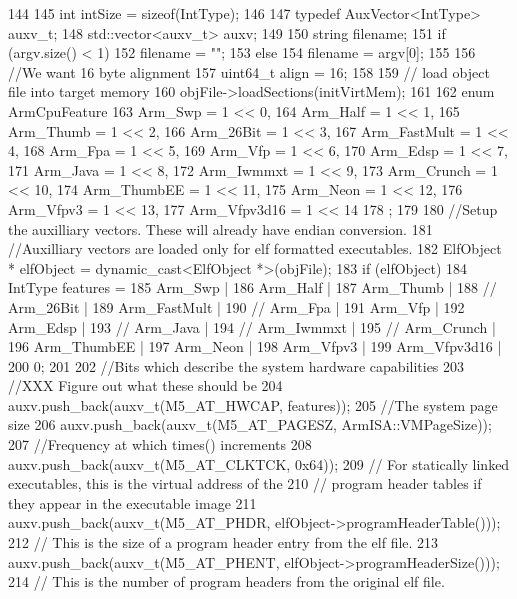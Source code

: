\begin{DoxyCode}
144 {
145     int intSize = sizeof(IntType);
146 
147     typedef AuxVector<IntType> auxv_t;
148     std::vector<auxv_t> auxv;
149 
150     string filename;
151     if (argv.size() < 1)
152         filename = "";
153     else
154         filename = argv[0];
155 
156     //We want 16 byte alignment
157     uint64_t align = 16;
158 
159     // load object file into target memory
160     objFile->loadSections(initVirtMem);
161 
162     enum ArmCpuFeature {
163         Arm_Swp = 1 << 0,
164         Arm_Half = 1 << 1,
165         Arm_Thumb = 1 << 2,
166         Arm_26Bit = 1 << 3,
167         Arm_FastMult = 1 << 4,
168         Arm_Fpa = 1 << 5,
169         Arm_Vfp = 1 << 6,
170         Arm_Edsp = 1 << 7,
171         Arm_Java = 1 << 8,
172         Arm_Iwmmxt = 1 << 9,
173         Arm_Crunch = 1 << 10,
174         Arm_ThumbEE = 1 << 11,
175         Arm_Neon = 1 << 12,
176         Arm_Vfpv3 = 1 << 13,
177         Arm_Vfpv3d16 = 1 << 14
178     };
179 
180     //Setup the auxilliary vectors. These will already have endian conversion.
181     //Auxilliary vectors are loaded only for elf formatted executables.
182     ElfObject * elfObject = dynamic_cast<ElfObject *>(objFile);
183     if (elfObject) {
184         IntType features =
185             Arm_Swp |
186             Arm_Half |
187             Arm_Thumb |
188 //            Arm_26Bit |
189             Arm_FastMult |
190 //            Arm_Fpa |
191             Arm_Vfp |
192             Arm_Edsp |
193 //            Arm_Java |
194 //            Arm_Iwmmxt |
195 //            Arm_Crunch |
196             Arm_ThumbEE |
197             Arm_Neon |
198             Arm_Vfpv3 |
199             Arm_Vfpv3d16 |
200             0;
201 
202         //Bits which describe the system hardware capabilities
203         //XXX Figure out what these should be
204         auxv.push_back(auxv_t(M5_AT_HWCAP, features));
205         //The system page size
206         auxv.push_back(auxv_t(M5_AT_PAGESZ, ArmISA::VMPageSize));
207         //Frequency at which times() increments
208         auxv.push_back(auxv_t(M5_AT_CLKTCK, 0x64));
209         // For statically linked executables, this is the virtual address of the
210         // program header tables if they appear in the executable image
211         auxv.push_back(auxv_t(M5_AT_PHDR, elfObject->programHeaderTable()));
212         // This is the size of a program header entry from the elf file.
213         auxv.push_back(auxv_t(M5_AT_PHENT, elfObject->programHeaderSize()));
214         // This is the number of program headers from the original elf file.
}}
\end{DoxyCode}
